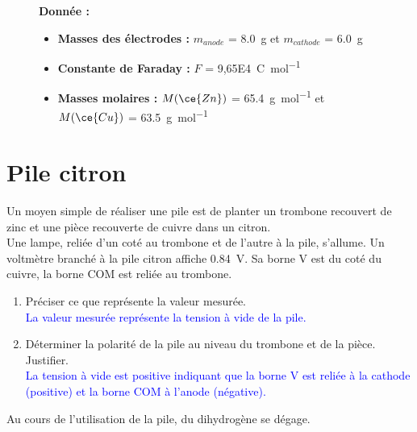 \documentclass[a4paper,11pt,fleqn]{article}%
\begin{document}
\begin{figure}[H]
    \begin{minipage}{\linewidth}
    \textbf{Donnée :}
    \begin{itemize}
        \item \textbf{Masses des électrodes :} $m_{anode}$ = \SI{8,0}{\gram} et $m_{cathode}$ = \SI{6,0}{\gram}
        \item \textbf{Constante de Faraday :} $F$ = \SI{9,65E4}{\coulomb\per\mole}
        \item \textbf{Masses molaires :} $M(\ce{Zn})$ = \SI{65,4}{\gram\per\mole} et $M(\ce{Cu})$ = \SI{63,5}{\gram\per\mole}
    \end{itemize}
    \end{minipage}
\end{figure}

\section{Pile citron}
Un moyen simple de réaliser une pile est de planter un trombone recouvert de zinc et une pièce recouverte de cuivre dans un citron.\\
Une lampe, reliée d'un coté au trombone et de l'autre à la pile, s'allume. Un voltmètre branché à la pile citron affiche \SI{0,84}{\volt}. Sa borne V est du coté du cuivre, la borne COM est reliée au trombone.
\begin{enumerate}
    \item Préciser ce que représente la valeur mesurée.\\
    \textcolor{blue}{La valeur mesurée représente la tension à vide de la pile.}
    \item Déterminer la polarité de la pile au niveau du trombone et de la pièce. Justifier.\\
    \textcolor{blue}{La tension à vide est positive indiquant que la borne V est reliée à la cathode (positive) et la borne COM à l'anode (négative).}
\end{enumerate}
Au cours de l'utilisation de la pile, du dihydrogène  se dégage.
\end{document}
